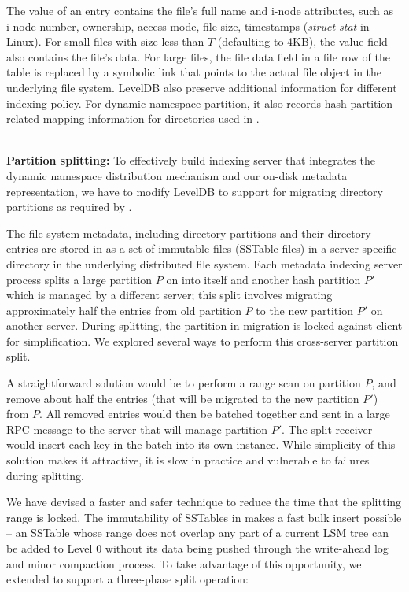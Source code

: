 The value of an entry contains the file's full name and i-node attributes,
such as i-node number, ownership, access mode, file size, timestamps (\textit{struct stat} in Linux).
For small files with size less than $T$ (defaulting to 4KB),
the value field also contains the file's data.
For large files, the file data field in a file row of the table
is replaced by a symbolic link that points to
the actual file object in the underlying file system.
LevelDB also preserve additional information for different
indexing policy. For dynamic namespace partition,
it also records hash partition related mapping information for directories
used in \giga.

~\\
\textbf{Partition splitting: }
To effectively build indexing server that integrates
the dynamic namespace distribution mechanism
and our on-disk metadata representation,
we have to modify LevelDB to support for
migrating directory partitions as required by \giga.

The file system metadata, including \giga directory partitions and their directory
entries are stored in \ldb as a set of immutable files (SSTable files)
in a server specific directory in the underlying distributed file system.
Each metadata indexing server process splits a large partition $P$ on
into itself and another hash partition $P'$ which is managed by a
different server; this split involves migrating approximately half the entries
from old partition $P$ to the new partition $P'$ on another server.
During splitting, the partition in migration is locked against client
for simplification. We explored several ways
to perform this cross-server partition split.

A straightforward solution would be to perform a range scan on
partition $P$, and remove about half the entries
(that will be migrated to the new partition $P'$) from $P$.
All removed entries would then be batched together
and sent in a large RPC message to the server that will manage partition $P'$.
The split receiver would insert each key in the batch into its own \ldb instance.
While simplicity of this solution makes it attractive,
it is slow in practice and vulnerable to failures during splitting.

We have devised a faster and safer technique to
reduce the time that the splitting range is locked.
The immutability of SSTables in \ldb makes a fast bulk insert possible --
an SSTable whose range does not overlap any part of a current LSM tree
can be added to Level 0 without its data being pushed through the
write-ahead log and minor compaction process.
To take advantage of this opportunity, we extended \ldb
to support a three-phase \giga split operation:

